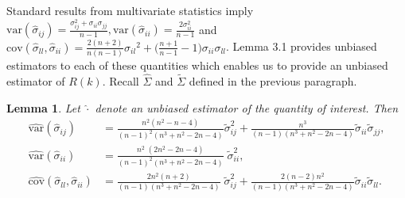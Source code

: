 \documentclass[11pt,oneside]{amsart}
\newtheorem{lemma}[theorem]{Lemma}
\begin{document}
Standard results from multivariate statistics \citep{anderson1984multivariate} imply 
${\text{var}}({\widehat{\sigma}}_{ij}) = \frac{\sigma_{ij}^{2} + \sigma_{ii}\sigma_{jj}}{n - 1}, {\text{var}}({\widehat{\sigma}}_{ii}) = \frac{2\sigma_{ii}^{2}}{n - 1}$ and ${\mbox{cov}}({\widehat{\sigma}}_{ll},{\widehat{\sigma}}_{ii}) = \frac{2 (n + 2)}{n (n - 1)}{\sigma_{il}}^{2} + \big(\frac{n+1}{n-1} - 1\big){\sigma_{ii}}{\sigma_{ll}}$. Lemma 3.1 provides unbiased estimators to each of these quantities which enables us to provide an unbiased estimator of $R(k)$. Recall ${\widehat{\Sigma}}$ and ${\widetilde{\Sigma}}$ defined in the previous paragraph. 
\begin{lemma} \label{Lemma A.2}
Let ${\widehat{\cdot}}$ denote an unbiased estimator of the quantity of interest. Then 
\small\begin{align} 
{\widehat{\mbox{var}}}({\widehat{\sigma}}_{ij}) &= \frac{n^2(n^2 - n -4)}{{(n-1)}^{2}{(n^3 + n^2 - 2n - 4)}}{\widetilde{\sigma}}_{ij}^{2} + \frac{n^3}{(n-1)(n^3 + n^2 - 2n -4)}{\widetilde{\sigma}}_{ii}{\widetilde{\sigma}}_{jj}, \label{eq25} \\
{\widehat{\text{var}}}({\widehat{\sigma}}_{ii}) &= \frac{{n^2}\;{(2n^2 - 2n - 4)}}{{{(n-1)}^2}{(n^3 + n^2 - 2n - 4)}}\;{\widetilde{\sigma}}_{ii}^{2},  \label{eq27} \\
{\widehat{\mbox{cov}}}({\widehat{\sigma}}_{ll}, {\widehat{\sigma}}_{ii}) &= \frac{2{n^2}(n + 2)}{{(n - 1)}{(n^3 + n^2 - 2n - 4)}}\;{\widetilde{\sigma}}_{ij}^{2} + \frac{2{(n-2)}{n^2}}{{(n-1)}{(n^3 + n^2 - 2n - 4)}}{\widetilde{\sigma}}_{ii}{\widetilde{\sigma}}_{ll}. \label{eq29}
\end{align}

\end{lemma}
\end{document}
